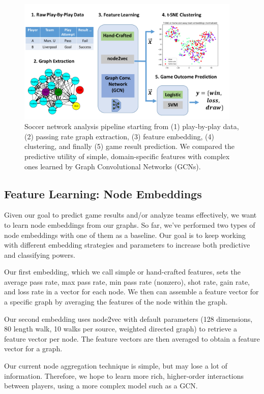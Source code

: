 \begin{figure}[h]
  \label{fig:block_diagram}
  \centering
  \includegraphics[width=0.95\textwidth]{plots/soccer_block_diagram.pdf}
  \caption{Soccer network analysis pipeline starting from (1) play-by-play data, (2) passing rate graph extraction, (3) feature embedding, (4) clustering, and finally (5) game result prediction. We compared the predictive utility of simple, domain-specific features with complex ones learned by Graph Convolutional Networks (GCNs).}
\end{figure}

\subsection{Feature Learning: Node Embeddings}
Given our goal to predict game results and/or analyze teams effectively, we want to learn node embeddings from our graphs. So far, we've performed two types of node embeddings with one of them as a baseline. Our goal is to keep working with different embedding strategies and parameters to increase both predictive and classifying powers. 

Our first embedding, which we call simple or hand-crafted features, sets the average pass rate, max pass rate, min pass rate (nonzero), shot rate, gain rate, and loss rate in a vector for each node. We then can assemble a feature vector for a specific graph by averaging the features of the node within the graph. 

Our second embedding uses node2vec with default parameters (128 dimensions, 80 length walk, 10 walks per source, weighted directed graph) to retrieve a feature vector per node. The feature vectors are then averaged to obtain a feature vector for a graph. 

Our current node aggregation technique is simple, but may lose a lot of information. 
Therefore, we hope to learn more rich, higher-order interactions between players, using a more complex model such as a  GCN.

